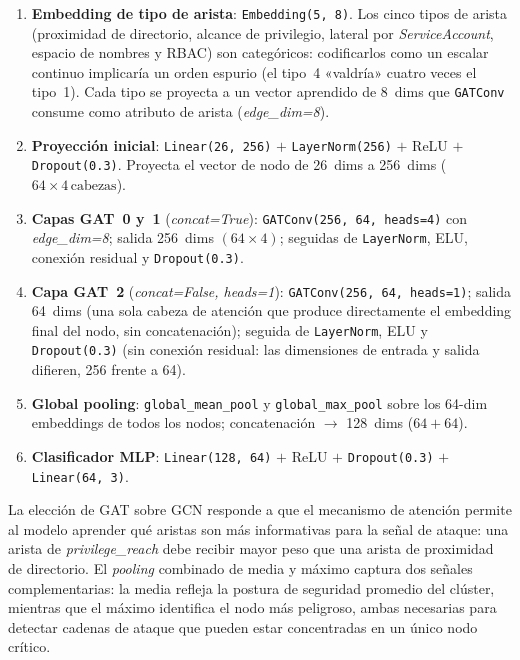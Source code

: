 \begin{enumerate}
\raggedright
  \item \textbf{Embedding de tipo de arista}: \texttt{Embedding(5, 8)}.
        Los cinco tipos de arista (proximidad de directorio, alcance de
        privilegio, lateral por \textit{ServiceAccount}, espacio de nombres y
        \ac{RBAC}) son categóricos: codificarlos como un escalar continuo
        implicaría un orden espurio (el tipo~4 «valdría» cuatro veces el
        tipo~1). Cada tipo se proyecta a un vector aprendido de 8~dims que
        \texttt{GATConv} consume como atributo de arista
        (\textit{edge\_dim=8}).
  \item \textbf{Proyección inicial}: \texttt{Linear(26, 256)} \(+\) \texttt{LayerNorm(256)}
        \(+\) \acs{ReLU} \(+\) \texttt{Dropout(0.3)}.
        Proyecta el vector de nodo de 26~dims a 256~dims
        (\(64 \times 4\,\text{cabezas}\)).
  \item \textbf{Capas \ac{GAT}~0 y~1} (\textit{concat=True}):
        \texttt{GATConv(256, 64, heads=4)} con \textit{edge\_dim=8};
        salida 256~dims \((64 \times 4)\); seguidas de \texttt{LayerNorm}, \acs{ELU},
        conexión residual y \texttt{Dropout(0.3)}.
  \item \textbf{Capa \ac{GAT}~2} (\textit{concat=False, heads=1}):
        \texttt{GATConv(256, 64, heads=1)}; salida 64~dims
        (una sola cabeza de atención que produce directamente
        el embedding final del nodo, sin concatenación);
        seguida de \texttt{LayerNorm}, \ac{ELU} y \texttt{Dropout(0.3)}
        (sin conexión residual: las dimensiones de entrada y salida difieren,
        256 frente a 64).
  \item \textbf{Global pooling}: \texttt{global\_mean\_pool} y \texttt{global\_max\_pool}
        sobre los 64-dim embeddings de todos los nodos; concatenación
        \(\to\) 128~dims (\(64 + 64\)).
  \item \textbf{Clasificador \ac{MLP}}: \texttt{Linear(128, 64)} \(+\) \ac{ReLU} \(+\)
        \texttt{Dropout(0.3)} \(+\) \texttt{Linear(64, 3)}.
\end{enumerate}

La elección de \ac{GAT} sobre \ac{GCN} responde a que el mecanismo de atención permite al modelo
aprender qué aristas son más informativas para la señal de ataque: una arista de
\textit{privilege\_reach} debe recibir mayor peso que una arista de proximidad de
directorio. El \textit{pooling} combinado de media y máximo captura dos señales
complementarias: la media refleja la postura de seguridad promedio del clúster,
mientras que el máximo identifica el nodo más peligroso, ambas necesarias para detectar
cadenas de ataque que pueden estar concentradas en un único nodo crítico.

